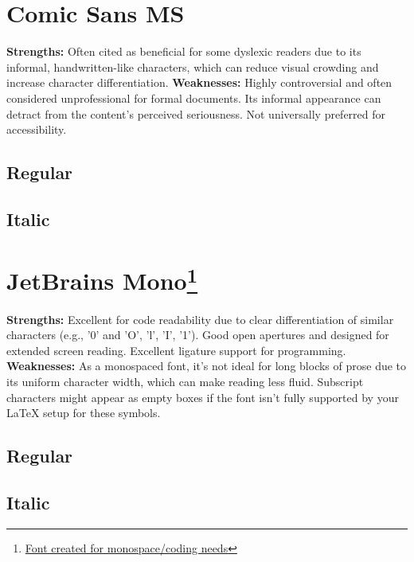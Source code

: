 \pagebreak
\section{Comic Sans MS}\label{trouble9}
\begin{raggedright}
\textbf{Strengths:} Often cited as beneficial for some dyslexic readers due to its informal, handwritten-like characters, which can reduce visual crowding and increase character differentiation.
\textbf{Weaknesses:} Highly controversial and often considered unprofessional for formal documents. Its informal appearance can detract from the content's perceived seriousness. Not universally preferred for accessibility.

\subsection{Regular}
\FontSample{\comicsansfont}

\subsection{Italic}
\FontSample{{\comicsansfont\itshape}}
\end{raggedright}


\pagebreak
\hypertarget{trouble10}{}\section[JetBrains Mono]{JetBrains Mono\footnote{\href{https://www.jetbrains.com/lp/mono/}{Font created for monospace/coding needs}}}\label{trouble10}
\begin{raggedright}
\textbf{Strengths:} Excellent for code readability due to clear differentiation of similar characters (e.g., '0' and 'O', 'l', 'I', '1'). Good open apertures and designed for extended screen reading. Excellent ligature support for programming.
\textbf{Weaknesses:} As a monospaced font, it's not ideal for long blocks of prose due to its uniform character width, which can make reading less fluid. Subscript characters might appear as empty boxes if the font isn't fully supported by your LaTeX setup for these symbols.

\subsection{Regular}
\FontSample{\jetbrainsmonofont}

\subsection{Italic}
\FontSample{{\jetbrainsmonofont\itshape}}
\end{raggedright}


